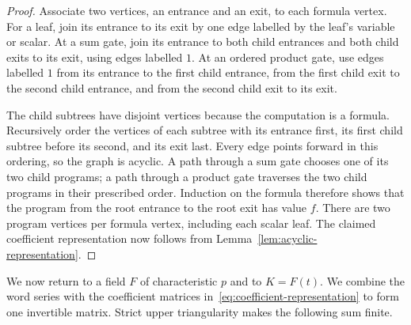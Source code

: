 \begin{proof}
Associate two vertices, an entrance and an exit, to each formula vertex.
For a leaf, join its entrance to its exit by one edge labelled by the leaf's
variable or scalar.  At a sum gate, join its entrance to both child entrances
and both child exits to its exit, using edges labelled $1$.  At an ordered
product gate, use edges labelled $1$ from its entrance to the first child
entrance, from the first child exit to the second child entrance, and from
the second child exit to its exit.

The child subtrees have disjoint vertices because the computation is a
formula.  Recursively order the vertices of each subtree with its entrance
first, its first child subtree before its second, and its exit last.  Every
edge points forward in this ordering, so the graph is acyclic.  A path through
a sum gate chooses one of its two child programs; a path through a product
gate traverses the two child programs in their prescribed order.  Induction
on the formula therefore shows that the program from the root entrance to
the root exit has value $f$.  There are two program vertices per formula
vertex, including each scalar leaf.  The claimed coefficient representation
now follows from Lemma~\ref{lem:acyclic-representation}.
\end{proof}

We now return to a field $F$ of characteristic $p$ and to $K=F(t)$.
We combine the word series with the coefficient matrices
in~\eqref{eq:coefficient-representation} to form one invertible matrix.
Strict upper triangularity makes the following sum finite.

